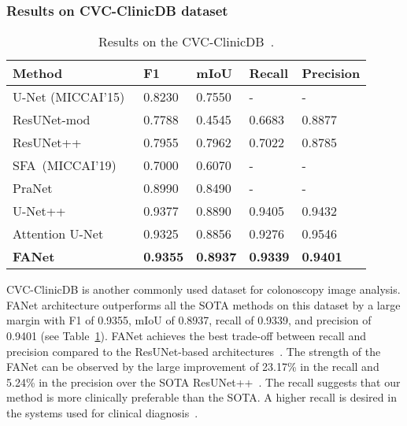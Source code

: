 \documentclass[journal]{IEEEtran}
\begin{document}
\subsubsection{Results on CVC-ClinicDB dataset}
\begin{table}[!t]
\footnotesize
\centering
\caption{Results on the CVC-ClinicDB~\cite{bernal2015wm}.}
\begin{tabular}{@{}l|l|l|l|l@{}}
\toprule
\textbf{Method} & \textbf{F1} & \textbf{mIoU }& \textbf{Recall} & \textbf{Precision} \\ 
\midrule
U-Net (MICCAI’15)~\cite{ronneberger2015u} & 0.8230 & 0.7550 & -  & - \\ ResUNet-mod~\cite{zhang2018road} & 0.7788 & 0.4545 & 0.6683 & 0.8877 \\ ResUNet++~\cite{jha2019resunet++}  & 0.7955 & 0.7962 & 0.7022 & 0.8785 \\ SFA~(MICCAI’19)~\cite{fang2019selective} & 0.7000 & 0.6070 & - & - \\ PraNet~\cite{fan2020pranet} & 0.8990 & 0.8490 & - & - \\ U-Net++~\cite{zhou2018unet++} &0.9377 &0.8890 &0.9405 &0.9432  \\ Attention U-Net~\cite{oktay2018attention} &0.9325 &0.8856 &0.9276 &0.9546  \\ \textbf{FANet} &\textbf{0.9355} & \textbf{0.8937} & \textbf{0.9339} & \textbf{0.9401} \\ \bottomrule
\end{tabular}
\label{tab:cvclinicDB}

\end{table}
CVC-ClinicDB is another commonly used dataset for colonoscopy image analysis. FANet architecture outperforms all the \ac{SOTA} methods on this dataset by a large margin with F1 of 0.9355, \ac{mIoU} of 0.8937, recall of 0.9339, and precision of 0.9401 (see Table~\ref{tab:cvclinicDB}). FANet achieves the best trade-off between recall and precision compared to the ResUNet-based architectures~\cite{zhang2018road,jha2019resunet++}. The strength of the FANet can be observed by the large improvement of 23.17\% in the recall and 5.24\% in the precision over the \ac{SOTA} ResUNet++~\cite{jha2019resunet++}. The recall suggests that our method is more clinically preferable than the \ac{SOTA}. A higher recall is desired in the systems used for clinical diagnosis~\cite{gilvary2019missing}.
\end{document}
